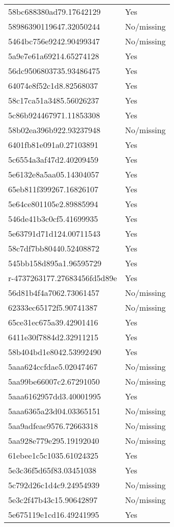 \begin{tabular}{ll}
58bc688380ad79.17642129 & Yes \\
58986390119647.32050244 & No/missing \\
5464bc756e9242.90499347 & No/missing \\
5a9e7e61a69214.65274128 & Yes \\
56dc9506803735.93486475 & Yes \\
64074e8f52c1d8.82568037 & Yes \\
58c17ca51a3485.56026237 & Yes \\
5c86b924467971.11853308 & Yes \\
58b02ea396b922.93237948 & No/missing \\
6401fb81e091a0.27103891 & Yes \\
5c6554a3af47d2.40209459 & Yes \\
5e6132e8a5aa05.14304057 & Yes \\
65eb811f399267.16826107 & Yes \\
5e64ce801105e2.89885994 & Yes \\
546de41b3c0cf5.41699935 & Yes \\
5e63791d71d124.00711543 & Yes \\
58c7df7bb80440.52408872 & Yes \\
545bb158d895a1.96595729 & Yes \\
r-4737263177.27683456fd5d89e & Yes \\
56d81b4f4a7062.73061457 & No/missing \\
62333ec65172f5.90741387 & No/missing \\
65ce31ec675a39.42901416 & Yes \\
6411e30f7884d2.32911215 & Yes \\
58b404bd1e8042.53992490 & Yes \\
5aaa624ccfdae5.02047467 & No/missing \\
5aa99be66007c2.67291050 & No/missing \\
5aaa6162957dd3.40001995 & Yes \\
5aaa6365a23d04.03365151 & No/missing \\
5aa9adfeae9576.72663318 & No/missing \\
5aa928e779e295.19192040 & No/missing \\
61ebee1c5c1035.61024325 & Yes \\
5e3c36f5d65f83.03451038 & Yes \\
5c792d26c1d4c9.24954939 & No/missing \\
5e3c2f47b43c15.90642897 & No/missing \\
5e675119e1cd16.49241995 & Yes \\

\end{tabular}
